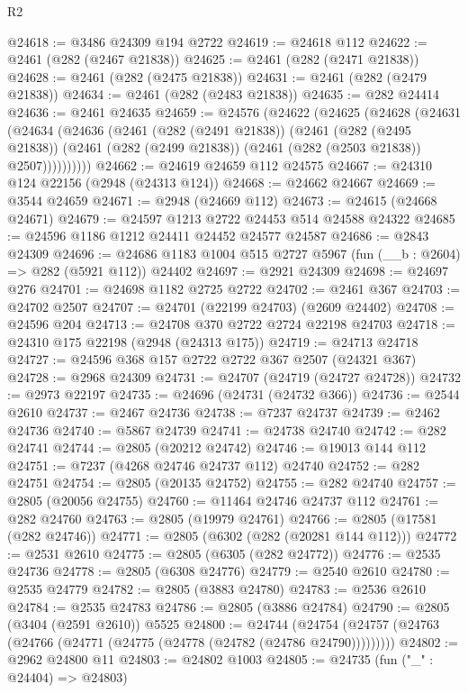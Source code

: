 \begin{lexlean}{R2}
\begin{coremodule}
@24618 := @3486 @24309 @194 @2722
@24619 := @24618 @112
@24622 := @2461 (@282 (@2467 @21838))
@24625 := @2461 (@282 (@2471 @21838))
@24628 := @2461 (@282 (@2475 @21838))
@24631 := @2461 (@282 (@2479 @21838))
@24634 := @2461 (@282 (@2483 @21838))
@24635 := @282 @24414
@24636 := @2461 @24635
@24659 := @24576
    (@24622
      (@24625
        (@24628
          (@24631
            (@24634
              (@24636
                (@2461
                  (@282 (@2491 @21838))
                  (@2461
                    (@282 (@2495 @21838))
                    (@2461 (@282 (@2499 @21838)) (@2461 (@282 (@2503 @21838)) @2507))))))))))
@24662 := @24619 @24659 @112 @24575
@24667 := @24310 @124 @22156 (@2948 (@24313 @124))
@24668 := @24662 @24667
@24669 := @3544 @24659
@24671 := @2948 (@24669 @112)
@24673 := @24615 (@24668 @24671)
@24679 := @24597 @1213 @2722 @24453 @514 @24588 @24322
@24685 := @24596 @1186 @1212 @24411 @24452 @24577 @24587
@24686 := @2843 @24309
@24696 := @24686 @1183 @1004 @515 @2727 @5967 (fun (__b : @2604) => @282 (@5921 @112)) @24402
@24697 := @2921 @24309
@24698 := @24697 @276
@24701 := @24698 @1182 @2725 @2722
@24702 := @2461 @367
@24703 := @24702 @2507
@24707 := @24701 (@22199 @24703) (@2609 @24402)
@24708 := @24596 @204
@24713 := @24708 @370 @2722 @2724 @22198 @24703
@24718 := @24310 @175 @22198 (@2948 (@24313 @175))
@24719 := @24713 @24718
@24727 := @24596 @368 @157 @2722 @2722 @367 @2507 (@24321 @367)
@24728 := @2968 @24309
@24731 := @24707 (@24719 (@24727 @24728))
@24732 := @2973 @22197
@24735 := @24696 (@24731 (@24732 @366))
@24736 := @2544 @2610
@24737 := @2467 @24736
@24738 := @7237 @24737
@24739 := @2462 @24736
@24740 := @5867 @24739
@24741 := @24738 @24740
@24742 := @282 @24741
@24744 := @2805 (@20212 @24742)
@24746 := @19013 @144 @112
@24751 := @7237 (@4268 @24746 @24737 @112) @24740
@24752 := @282 @24751
@24754 := @2805 (@20135 @24752)
@24755 := @282 @24740
@24757 := @2805 (@20056 @24755)
@24760 := @11464 @24746 @24737 @112
@24761 := @282 @24760
@24763 := @2805 (@19979 @24761)
@24766 := @2805 (@17581 (@282 @24746))
@24771 := @2805 (@6302 (@282 (@20281 @144 @112)))
@24772 := @2531 @2610
@24775 := @2805 (@6305 (@282 @24772))
@24776 := @2535 @24736
@24778 := @2805 (@6308 @24776)
@24779 := @2540 @2610
@24780 := @2535 @24779
@24782 := @2805 (@3883 @24780)
@24783 := @2536 @2610
@24784 := @2535 @24783
@24786 := @2805 (@3886 @24784)
@24790 := @2805 (@3404 (@2591 @2610)) @5525
@24800 := @24744
    (@24754 (@24757 (@24763 (@24766 (@24771 (@24775 (@24778 (@24782 (@24786 @24790)))))))))
@24802 := @2962 @24800 @11
@24803 := @24802 @1003
@24805 := @24735 (fun ("_" : @24404) => @24803)

\end{coremodule}
\end{lexlean}
